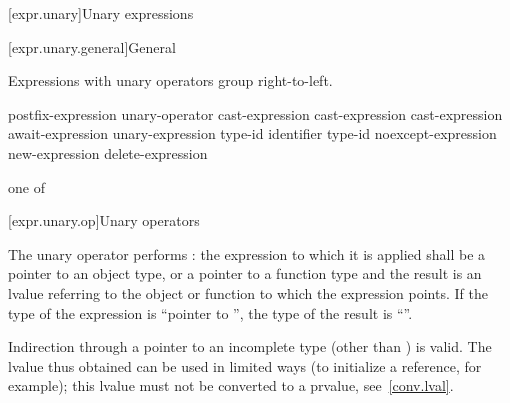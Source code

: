 [expr.unary]{Unary expressions}

[expr.unary.general]{General}

\pnum
{}%
Expressions with unary operators group right-to-left.

%
%
%
%
%
\begin{bnf}
\br
    postfix-expression\br
    unary-operator cast-expression\br
    \terminal{++} cast-expression\br
    \terminal{--} cast-expression\br
    await-expression\br
     unary-expression\br
     \terminal{(} type-id \terminal{)}\br
      \terminal{(} identifier \terminal{)}\br
     \terminal{(} type-id \terminal{)}\br
    noexcept-expression\br
    new-expression\br
    delete-expression
\end{bnf}

%
%
%
%
%
%
%
%
%
%
%
%
%
%
%
\begin{bnf}
 \textnormal{one of}\br
    \terminal{*  \&  +  -  !  \~}
\end{bnf}

[expr.unary.op]{Unary operators}

\pnum
{}%
%
The unary \tcode{*} operator performs :
%
the expression to which it is applied shall be a pointer to an object
type, or a pointer to a function type and the result is an lvalue
referring to the object or function to which the expression points. If
the type of the expression is ``pointer to '', the type of the
result is ``''.
\begin{note}
%
Indirection through a pointer to an incomplete type (other than
\cv{} ) is valid. The lvalue thus obtained can be
used in limited ways (to initialize a reference, for example); this
lvalue must not be converted to a prvalue, see~\ref{conv.lval}.
\end{note}

